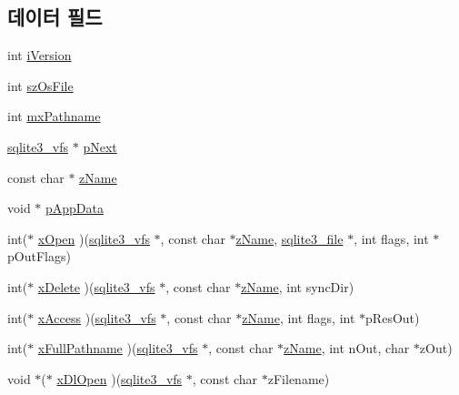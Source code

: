 \subsection*{데이터 필드}
\begin{DoxyCompactItemize}
\item 
int \hyperlink{structsqlite3__vfs_a694dd264949bd163545fe174510ed019}{i\+Version}
\item 
int \hyperlink{structsqlite3__vfs_a549399081342d61134b6398562a0a997}{sz\+Os\+File}
\item 
int \hyperlink{structsqlite3__vfs_adb2d82c74891b00b5529fb94e7710135}{mx\+Pathname}
\item 
\hyperlink{structsqlite3__vfs}{sqlite3\+\_\+vfs} $\ast$ \hyperlink{structsqlite3__vfs_ae795a4417697ecd35163f6cdf0069073}{p\+Next}
\item 
const char $\ast$ \hyperlink{structsqlite3__vfs_a0f06a27ac2201ea04c0623ef19e5d73e}{z\+Name}
\item 
void $\ast$ \hyperlink{structsqlite3__vfs_a1ba832cf207fe59c1fc8eb436524bc35}{p\+App\+Data}
\item 
int($\ast$ \hyperlink{structsqlite3__vfs_ab106b445eb5d372266a1108fc982a9aa}{x\+Open} )(\hyperlink{structsqlite3__vfs}{sqlite3\+\_\+vfs} $\ast$, const char $\ast$\hyperlink{structsqlite3__vfs_a0f06a27ac2201ea04c0623ef19e5d73e}{z\+Name}, \hyperlink{structsqlite3__file}{sqlite3\+\_\+file} $\ast$, int flags, int $\ast$p\+Out\+Flags)
\item 
int($\ast$ \hyperlink{structsqlite3__vfs_a9a84baca80b7ab2da9fb147cb40c73d2}{x\+Delete} )(\hyperlink{structsqlite3__vfs}{sqlite3\+\_\+vfs} $\ast$, const char $\ast$\hyperlink{structsqlite3__vfs_a0f06a27ac2201ea04c0623ef19e5d73e}{z\+Name}, int sync\+Dir)
\item 
int($\ast$ \hyperlink{structsqlite3__vfs_a3a5cc43f1b8a88747eb77db730ce4f69}{x\+Access} )(\hyperlink{structsqlite3__vfs}{sqlite3\+\_\+vfs} $\ast$, const char $\ast$\hyperlink{structsqlite3__vfs_a0f06a27ac2201ea04c0623ef19e5d73e}{z\+Name}, int flags, int $\ast$p\+Res\+Out)
\item 
int($\ast$ \hyperlink{structsqlite3__vfs_ae6573ffda4c4f014960b0ec3a1522dfa}{x\+Full\+Pathname} )(\hyperlink{structsqlite3__vfs}{sqlite3\+\_\+vfs} $\ast$, const char $\ast$\hyperlink{structsqlite3__vfs_a0f06a27ac2201ea04c0623ef19e5d73e}{z\+Name}, int n\+Out, char $\ast$z\+Out)
\item 
void $\ast$($\ast$ \hyperlink{structsqlite3__vfs_a4de0324cd74c8ec98e4605d432f16e0a}{x\+Dl\+Open} )(\hyperlink{structsqlite3__vfs}{sqlite3\+\_\+vfs} $\ast$, const char $\ast$z\+Filename)

\end{DoxyCompactItemize}
